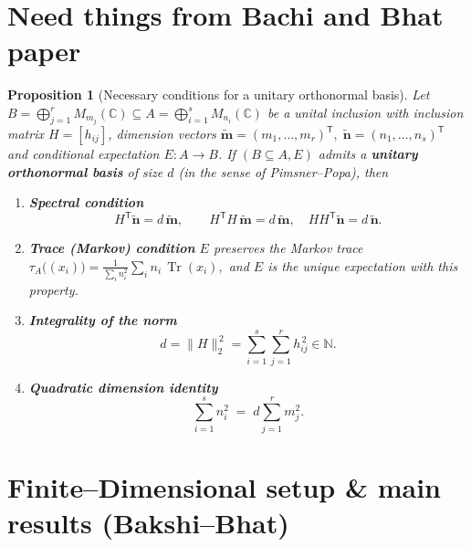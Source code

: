 \documentclass[11pt]{article}
\theoremstyle{mytheoremstyle}
\newtheorem{proposition}[theorem]{\color{MyPurple}Proposition}
\theoremstyle{definition}
\theoremstyle{remark}
\DeclareMathOperator{\Tr}{Tr}
\newcommand{\bbC}{\mathbb{C}}
\begin{document}
\newpage
\section{Need things from Bachi and Bhat paper}

\begin{proposition}[{\color{MyPurple}Necessary conditions for a unitary orthonormal basis}]
\leavevmode

Let $B=\bigoplus_{j=1}^{r}M_{m_j}(\bbC)\subseteq
      A=\bigoplus_{i=1}^{s}M_{n_i}(\mathbb{C})$ be a unital inclusion with
inclusion matrix $H=[h_{ij}]$, dimension vectors
\(
  \widetilde{\bm m}=(m_1,\dots,m_r)^{\!\mathsf T},\;\widetilde{\bm n}=(n_1,\dots,n_s)^{\!\mathsf T}
\)
and conditional expectation $E\colon A\to B$. 
If $(B\subseteq A,E)$ admits a \textbf{unitary orthonormal basis} of size $d$
(in the sense of Pimsner–Popa), then\vspace{0.4em}

\begin{enumerate}[label=\textup{(\arabic*)}]
  \item \textbf{Spectral condition}
        \[
           H^{\!\mathsf T}\widetilde{\bm n}=d\,\widetilde{\bm m},\qquad
           H^{\!\mathsf T}H\,\widetilde{\bm m}=d\,\widetilde{\bm m},\quad
           HH^{\!\mathsf T}\widetilde{\bm n}=d\,\widetilde{\bm n}.
        \]

  \item \textbf{Trace (Markov) condition}\; 
        $E$ preserves the Markov trace
        \(
          \displaystyle
          \tau_A\!\bigl((x_i)\bigr)=\frac{1}{\sum_{i}n_i^{2}}
          \sum_{i} n_i\,\Tr(x_i),
        \)
        and $E$ is the \emph{unique} expectation with this property.

  \item \textbf{Integrality of the norm}
        \[
          d=\lVert H\rVert_2^{\,2}
          =\sum_{i=1}^{s}\sum_{j=1}^{r}h_{ij}^{\,2}\in\mathbb{N}.
        \]

  \item \textbf{Quadratic dimension identity}
        \[
          \sum_{i=1}^{s}n_i^{2}
          \;=\; 
          d\sum_{j=1}^{r}m_j^{2}.
        \]
\end{enumerate}
\end{proposition}


\section{Finite–Dimensional setup \& main results (Bakshi–Bhat)}
\end{document}
